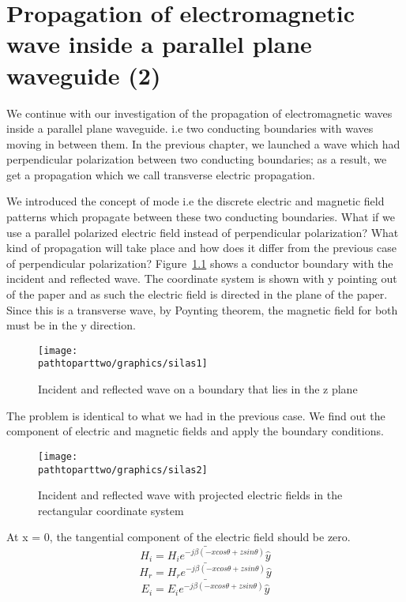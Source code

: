 \chapter{Propagation of electromagnetic wave inside a parallel plane waveguide (2)}
We continue with our investigation of the propagation of electromagnetic waves inside a parallel plane waveguide. i.e two conducting boundaries with waves moving in between them. In the previous chapter, we launched a wave which had perpendicular polarization between two conducting boundaries; as a result, we get a propagation which we call transverse electric propagation.

We introduced the concept of mode i.e the discrete electric and magnetic field patterns which propagate between these two conducting boundaries. What if we use a parallel polarized electric field instead of perpendicular polarization? What kind of propagation will take place and how does it differ from the previous case of perpendicular polarization? Figure~\ref{fig:silas1} shows a conductor boundary with the incident and reflected wave. The coordinate system is shown with y pointing out of the paper and as such the electric field is directed in the plane of the paper. Since this is a transverse wave, by Poynting theorem, the magnetic field for both must be in the y direction.
\begin{figure}[h]
\centering
\texttt{[image: \\pathtoparttwo/graphics/silas1]}
\caption{Incident and reflected wave on a boundary that lies in the z plane}
\label{fig:silas1}
\end{figure}
The problem is identical to what we had in the previous case. We find out the component of electric and magnetic fields and apply the boundary conditions.
\begin{figure}[h]
\centering
\texttt{[image: \\pathtoparttwo/graphics/silas2]}
\caption{Incident and reflected wave with projected electric fields in the rectangular coordinate system}
\label{fig:silas2}
\end{figure}
At x = 0, the tangential component of the electric field should be zero.
\begin{equation*}
\bar{H_{i} = H_{i} e^{-j\beta(-xcos\theta + zsin\theta)} \hat{y}}
\end{equation*}
\begin{equation*}
\bar{H_{r} = H_{r} e^{-j\beta(-xcos\theta + zsin\theta)} \hat{y}}
\end{equation*}
\begin{equation*}
\bar{E_{i} = E_{i} e^{-j\beta(-xcos\theta + zsin\theta)} \hat{y}}
\end{equation*}
